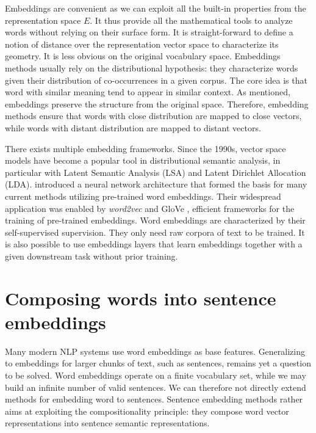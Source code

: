 Embeddings are convenient as we can exploit all the built-in properties from the representation space $E$. It thus provide all the mathematical tools to analyze words without relying on their surface form. It is straight-forward to define a notion of distance over the representation vector space to characterize its geometry. It is less obvious on the original vocabulary space. Embeddings methods usually rely on the distributional hypothesis: they characterize words given their distribution of co-occurrences in a given corpus. The core idea is that word with similar meaning tend to appear in similar context. As mentioned, embeddings preserve the structure from the original space. Therefore, embedding methods ensure that words with close distribution are mapped to close vectors, while words with distant distribution are mapped to distant vectors.

There exists multiple embedding frameworks. Since the 1990s, vector space models have become a popular tool in distributional semantic analysis, in particular with Latent Semantic Analysis (LSA) and Latent Dirichlet Allocation (LDA). \textcite{collobert_08} introduced a neural network architecture that formed the basis for many current methods utilizing pre-trained word embeddings. Their widespread application was enabled by \textsl{word2vec} \parencite{mikolov_13a, mikolov_13b} and GloVe \parencite{pennington_14}, efficient frameworks for the training of pre-trained embeddings. Word embeddings are characterized by their self-supervised supervision. They only need raw corpora of text to be trained. It is also possible to use embeddings layers that learn embeddings together with a given downstream task without prior training.

\section{Composing words into sentence embeddings}

Many modern NLP systems use word embeddings as base features. Generalizing to embeddings for larger chunks of text, such as sentences, remains yet a question to be solved. Word embeddings operate on a finite vocabulary set, while we may build an infinite number of valid sentences. We can therefore not directly extend methods for embedding word to sentences. Sentence embedding methods rather aims at exploiting the compositionality principle: they compose word vector representations into sentence semantic representations.

